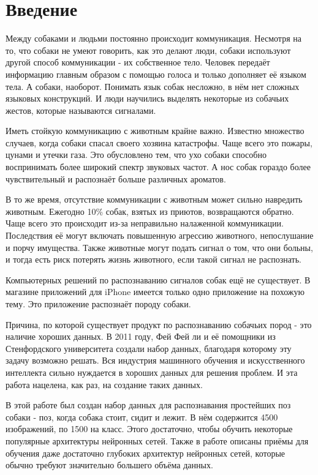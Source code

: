 \chapter*{Введение}							%

Между собаками и людьми постоянно происходит коммуникация. Несмотря на то, что собаки не умеют говорить, как это делают люди, собаки используют другой способ коммуникации - их собственное тело. Человек передаёт информацию главным образом с помощью голоса и только дополняет её языком тела. А собаки, наоборот. Понимать язык собак несложно, в нём нет сложных языковых конструкций. И люди научились выделять некоторые из собачьих жестов, которые называются сигналами. 

Иметь стойкую коммуникацию с животным крайне важно. Известно множество случаев, когда собаки спасал своего хозяина катастрофы. Чаще всего это пожары, цунами и утечки газа. Это обусловлено тем, что ухо собаки способно воспринимать более широкий спектр звуковых частот. А нос собак гораздо более чувствительный и распознаёт больше различных ароматов.

В то же время, отсутствие коммуникации с животным может сильно навредить животным. Ежегодно 10\% собак, взятых из приютов, возвращаются обратно. Чаще всего это происходит из-за неправильно налаженной коммуникации.\cite{reasons_dogs_return_to_shelters} Последствия её могут включать повышенную агрессию животного, непослушание и порчу имущества. Также животные могут подать сигнал о том, что они больны, и тогда есть риск потерять жизнь животного, если такой сигнал не распознать. 

Компьютерных решений по распознаванию сигналов собак ещё не существует. В магазине приложений для iPhone имеется только одно приложение на похожую тему. Это приложение распознаёт породу собаки. 

Причина, по которой существует продукт по распознаванию собачьих пород - это наличие хороших данных. В 2011 году, Фей Фей ли и её помощники из Стенфордского университета \cite{KhoslaYaoJayadevaprakashFeiFei_FGVC2011} создали набор данных, благодаря которому эту задачу возможно решать. Вся индустрия машинного обучения и искусственного интеллекта сильно нуждается в хороших данных для решения проблем. И эта работа нацелена, как раз, на создание таких данных. 

В этой работе был создан набор данных для распознавания простейших поз собаки - поз, когда собака стоит, сидит и лежит. В нём содержится 4500 изображений, по 1500 на класс. Этого достаточно, чтобы обучить некоторые популярные архитектуры нейронных сетей. Также в работе описаны приёмы для обучения даже достаточно глубоких архитектур нейронных сетей, которые обычно требуют значительно большего объёма данных.
